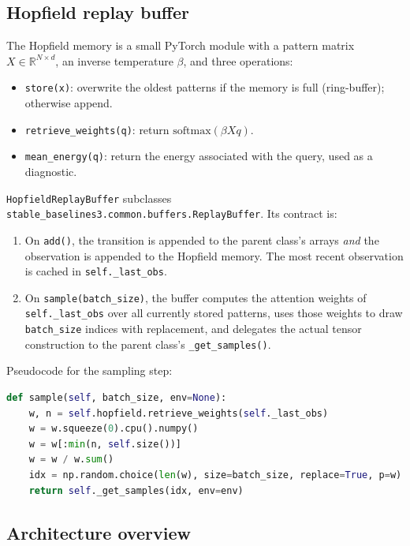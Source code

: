 \documentclass[a4paper,11pt]{article}
\begin{document}
\subsection{Hopfield replay buffer}

The Hopfield memory is a small PyTorch module with a pattern matrix
$X \in \mathbb{R}^{N \times d}$, an inverse temperature $\beta$, and three
operations:

\begin{itemize}
    \item \texttt{store(x)}: overwrite the oldest patterns if the memory is
    full (ring-buffer); otherwise append.
    \item \texttt{retrieve\_weights(q)}: return
    $\mathrm{softmax}(\beta X q)$.
    \item \texttt{mean\_energy(q)}: return the energy associated with the
    query, used as a diagnostic.
\end{itemize}

\texttt{HopfieldReplayBuffer} subclasses
\texttt{stable\_baselines3.common.buffers.ReplayBuffer}. Its contract is:

\begin{enumerate}
    \item On \texttt{add()}, the transition is appended to the parent
    class's arrays \emph{and} the observation is appended to the Hopfield
    memory. The most recent observation is cached in \texttt{self.\_last\_obs}.
    \item On \texttt{sample(batch\_size)}, the buffer computes the
    attention weights of \texttt{self.\_last\_obs} over all currently
    stored patterns, uses those weights to draw \texttt{batch\_size}
    indices with replacement, and delegates the actual tensor
    construction to the parent class's \texttt{\_get\_samples()}.
\end{enumerate}

\noindent
Pseudocode for the sampling step:

\begin{lstlisting}[language=Python]
def sample(self, batch_size, env=None):
    w, n = self.hopfield.retrieve_weights(self._last_obs)
    w = w.squeeze(0).cpu().numpy()
    w = w[:min(n, self.size())]
    w = w / w.sum()
    idx = np.random.choice(len(w), size=batch_size, replace=True, p=w)
    return self._get_samples(idx, env=env)
\end{lstlisting}

\subsection{Architecture overview}
\end{document}
